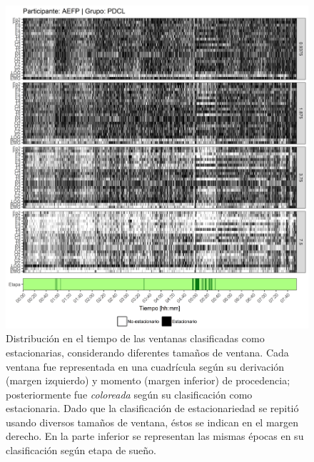 \documentclass[12pt,letterpaper,draft]{book}
\begin{document}
\begin{figure}
\centering
\includegraphics[width=\linewidth]
{./scripts_graf_res/AEFP_patrones_1.png}
\caption[Distribución en el tiempo de las ventanas clasificadas como estacionarias, considerando diferentes tamaños de ventana]{Distribución en el tiempo de las ventanas clasificadas como estacionarias, considerando diferentes tamaños de ventana. 
Cada ventana fue representada en una cuadrícula según su derivación (margen izquierdo) y momento (margen inferior) de procedencia; posteriormente fue \textit{coloreada} según su clasificación como estacionaria.
Dado que la clasificación de estacionariedad se repitió usando diversos tamaños de ventana, éstos se indican en el margen derecho.
En la parte inferior se representan las mismas épocas en su clasificación según etapa de sueño.}
\end{figure}
\end{document}
